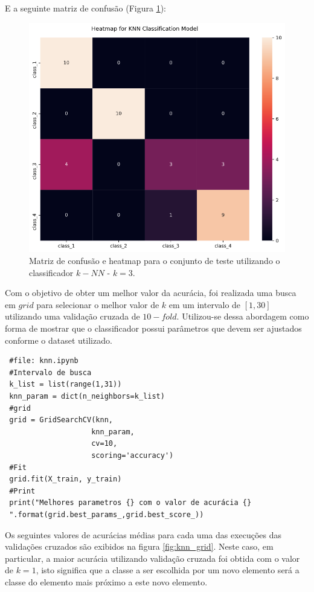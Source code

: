 \documentclass[
	article,			%
	11pt,				%
	oneside,			%
	a4paper,			%
	english,			%
	brazil,				%
	sumario=tradicional
	]{abntex2}
\begin{document}
E a seguinte matriz de confusão (Figura \ref{fig:knn_cm01}):

\begin{figure}[h!]
 \centering
 \includegraphics[scale=0.35]{fig/knn_cm01.png}
 \caption{Matriz de confusão e heatmap para o conjunto de teste utilizando o classificador $k-NN$ - $k=3$.}
 \label{fig:knn_cm01}
\end{figure}

Com o objetivo de obter um melhor valor da acurácia, foi realizada uma busca em $grid$ para selecionar o melhor valor de $k$ em um intervalo de $[1,30]$ utilizando uma validação cruzada de $10-fold$. Utilizou-se dessa abordagem como forma de mostrar que o classificador possui parâmetros que devem ser ajustados conforme o dataset utilizado. 

\begin{verbatim}
 #file: knn.ipynb
 #Intervalo de busca
 k_list = list(range(1,31))
 knn_param = dict(n_neighbors=k_list)
 #grid
 grid = GridSearchCV(knn,
                    knn_param, 
                    cv=10, 
                    scoring='accuracy')
 #Fit
 grid.fit(X_train, y_train)
 #Print
 print("Melhores parametros {} com o valor de acurácia {}
 ".format(grid.best_params_,grid.best_score_))
\end{verbatim}


Os seguintes valores de acurácias médias para cada uma das execuções das validações cruzados são exibidos na figura \ref{fig:knn_grid}. Neste caso, em particular, a maior acurácia utilizando validação cruzada foi obtida com o valor de $k=1$, isto significa que a classe a ser escolhida por um novo elemento será a classe do elemento mais próximo a este novo elemento.
\end{document}
